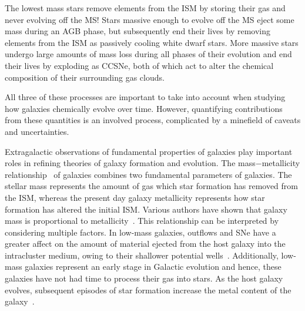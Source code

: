 \documentclass[a4paper,12pt]{article}
\begin{document}
The lowest mass stars remove elements from the ISM by storing their gas and never evolving off the MS! 
Stars massive enough to evolve off the MS eject some mass during an AGB phase, but subsequently end their lives by removing elements from the ISM as passively cooling white dwarf stars. 
More massive stars undergo large amounts of mass loss during all phases of their evolution and end their lives by exploding as CCSNe, both of which act to alter the chemical composition of their surrounding gas clouds. 

All three of these processes are important to take into account when studying how galaxies chemically evolve over time.
However, quantifying contributions from these quantities is an involved process, complicated by a minefield of caveats and uncertainties.

Extragalactic observations of fundamental properties of galaxies play important roles in refining theories of galaxy formation and evolution.
The mass$-$metallicity relationship~\citep[MZR;][]{Lequeux79} of galaxies combines two fundamental parameters of galaxies.
The stellar mass represents the amount of gas which star formation has removed from the ISM, whereas the present day galaxy metallicity represents how star formation has altered the initial ISM. 
Various authors have shown that galaxy mass is proportional to metallicity~\citep{Tremonti04, Maiolino08,Kewley08}. 
This relationship can be interpreted by considering multiple factors.
In low-mass galaxies, outflows and SNe have a greater affect on the amount of material ejected from the host galaxy into the intracluster medium, owing to their shallower potential wells~\citep[e.g.][]{Tremonti04}. 
Additionally, low-mass galaxies represent an early stage in Galactic evolution and hence, these galaxies have not had time to process their gas into stars. 
As the host galaxy evolves, subsequent episodes of star formation increase the metal content of the galaxy~\citep[e.g.][and references therein]{Maiolino08}.
\end{document}
